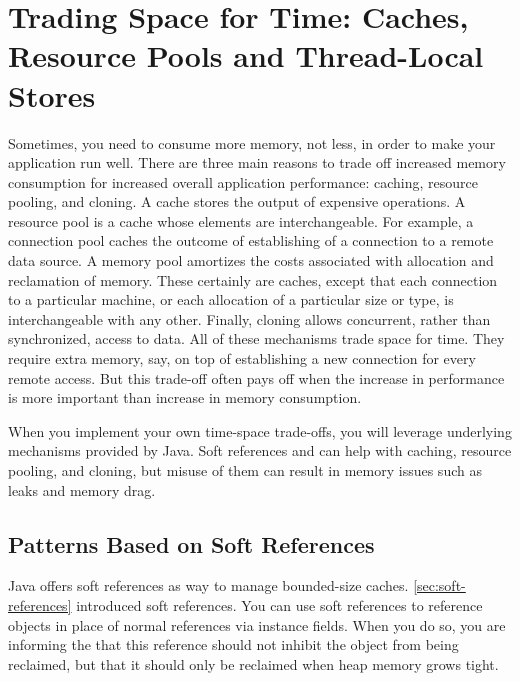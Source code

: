 \chapter[Trading Space for Time]{Trading Space for Time: Caches, Resource Pools and Thread-Local
Stores}
\label{chapter:trading-space-for-time}

Sometimes, you need to consume more memory, not less, in order to make your
application run well. There are three main reasons to trade off increased memory
consumption for increased overall application performance: caching, resource
pooling, and cloning. A cache stores the output of expensive operations. A
resource pool is a cache whose elements are interchangeable. For example, a
connection pool caches the outcome of establishing of a connection to a remote
data source. A memory pool amortizes the costs associated with allocation and
reclamation of memory. These certainly are caches, except that each connection
to a particular machine, or each allocation of a particular size or type, is
interchangeable with any other. Finally, cloning allows concurrent, rather than
synchronized, access to data. All of these mechanisms trade space for time. They
require extra memory, say, on top of establishing a new connection for every
remote access. But this trade-off often pays off when the increase in
performance is more important than increase in memory consumption.

When you implement your own time-space trade-offs, you will leverage underlying
mechanisms provided by Java. Soft references and \tls can help with caching,
resource pooling, and cloning, but misuse of them can result in memory issues
such as leaks and memory drag.


\section{Patterns Based on Soft References}
\label{sec:soft-reference-details}

Java offers soft references as way to manage bounded-size caches.
\autoref{sec:soft-references} introduced soft references. You can use soft
references to reference objects in place of normal references via instance
fields. When you do so, you are informing the \jre that this reference should
not inhibit the object from being reclaimed, but that it should only be
reclaimed when heap memory grows tight.

